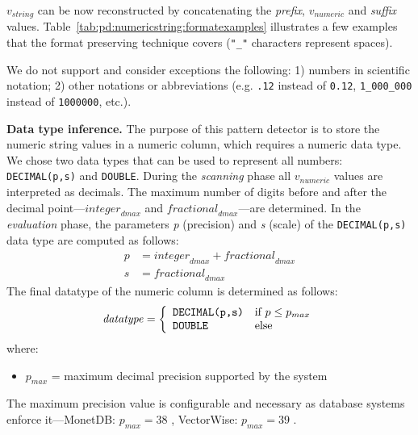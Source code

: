 \(v_{string}\) can be now reconstructed by concatenating the \textit{prefix}, \(v_{numeric}\) and \textit{suffix} values. Table~\ref{tab:pd:numericstring:formatexamples} illustrates a few examples that the format preserving technique covers (\verb|"_"| characters represent spaces).



We do not support and consider exceptions the following: 1) numbers in scientific notation; 2) other notations or abbreviations (e.g. \verb|.12| instead of \verb|0.12|, \verb|1_000_000| instead of \verb|1000000|, etc.).

\textbf{Data type inference.} The purpose of this pattern detector is to store the numeric string values in a numeric column, which requires a numeric data type. We chose two data types that can be used to represent all numbers: \verb|DECIMAL(p,s)| and \verb|DOUBLE|. During the \textit{scanning} phase all \(v_{numeric}\) values are interpreted as decimals. The maximum number of digits before and after the decimal point---\(\mathit{integer}_{dmax}\) and \(\mathit{fractional}_{dmax}\)---are determined.  In the \textit{evaluation} phase, the parameters \textit{p} (precision) and \textit{s} (scale) of the \verb|DECIMAL(p,s)| data type are computed as follows:
\begin{equation}
\label{eq:pd:numericstrings:precisionscale}
\begin{array}{ll}
    p &= \mathit{integer}_{dmax} + \mathit{fractional}_{dmax}\\
    s &= \mathit{fractional}_{dmax}
\end{array}
\end{equation}
The final datatype of the numeric column is determined as follows:
\begin{equation}
\label{eq:pd:numericstrings:datatype}
\mathit{datatype} = 
\left\{
\begin{array}{ll}
    \verb|DECIMAL(p,s)| & \mbox{if } p \leq p_{max}\\
    \verb|DOUBLE| & \mbox{else}
\end{array}
\right.
\end{equation}
where:
\begin{itemize}
    \item[] \(p_{max}\) = maximum decimal precision supported by the system
\end{itemize}
The maximum precision value is configurable and necessary as database systems enforce it---MonetDB: \(p_{max}=38\) \cite{monetdbdatatypes}, VectorWise: \(p_{max}=39\) \cite{vectorwisedecimal}.

